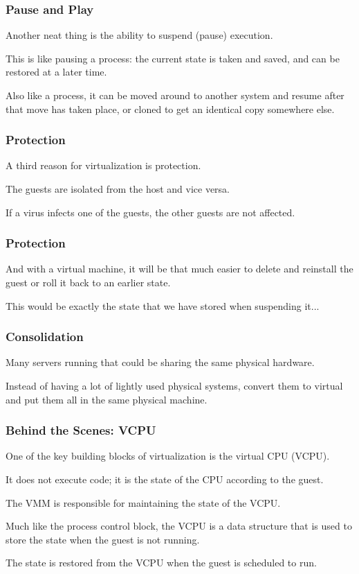 \begin{frame}
\frametitle{Pause and Play}

Another neat thing is the ability to suspend (pause) execution. 

This is like pausing a process: the current state is taken and saved, and can be restored at a later time. 

Also like a process, it can be moved around to another system and resume after that move has taken place, or cloned to get an identical copy somewhere else.


\end{frame}

\begin{frame}
\frametitle{Protection}

A third reason for virtualization is protection. 

The guests are isolated from the host and vice versa. 

If a virus infects one of the guests, the other guests are not affected. 

\end{frame}

\begin{frame}
\frametitle{Protection}

And with a virtual machine, it will be that much easier to delete and reinstall the guest or roll it back to an earlier state. 

This would be exactly the state that we have stored when suspending it...


\end{frame}

\begin{frame}
\frametitle{Consolidation}


Many servers running that could be sharing the same physical hardware. 

Instead of having a lot of lightly used physical systems, convert them to virtual and put them all in the same physical machine. 


\end{frame}

\begin{frame}
\frametitle{Behind the Scenes: VCPU}

One of the key building blocks of virtualization is the \alert{virtual CPU} (VCPU). 

It does not execute code; it is the state of the CPU according to the guest. 

The VMM is responsible for maintaining the state of the VCPU. 

Much like the process control block, the VCPU is a data structure that is used to store the state when the guest is not running.

The state is restored from the VCPU when the guest is scheduled to run.

\end{frame}

